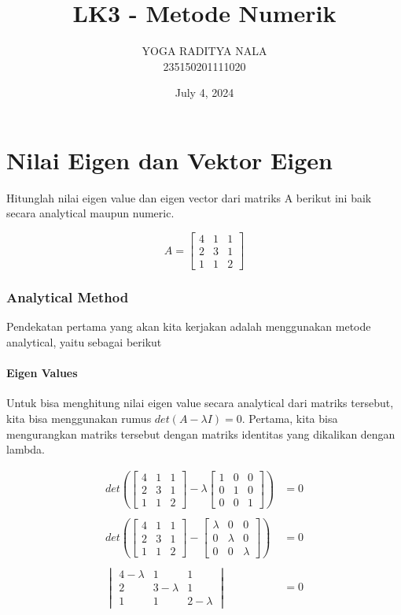 \documentclass{article}
\title{LK3 - Metode Numerik}
\author{YOGA RADITYA NALA\\
235150201111020}
\date{July 4, 2024}
\begin{document}
\maketitle

\part{Nilai Eigen dan Vektor Eigen}
Hitunglah nilai eigen value dan eigen vector dari matriks A berikut ini baik secara analytical maupun numeric.

$$
A=
\begin{bmatrix}
4 & 1 & 1\\
2 & 3 & 1\\
1 & 1 & 2
\end{bmatrix}
$$

\section{Analytical Method}
Pendekatan pertama yang akan kita kerjakan adalah menggunakan metode analytical, yaitu sebagai berikut\\

\subsection{Eigen Values}
Untuk bisa menghitung nilai eigen value secara analytical dari matriks tersebut, kita bisa menggunakan rumus $det(A - \lambda I) = 0$. Pertama, kita bisa mengurangkan matriks tersebut dengan matriks identitas yang dikalikan dengan lambda.

\begin{align*}
det \left(
\begin{bmatrix}
4 & 1 & 1\\
2 & 3 & 1\\
1 & 1 & 2
\end{bmatrix}
- \lambda
\begin{bmatrix}
1 & 0 & 0\\
0 & 1 & 0\\
0 & 0 & 1
\end{bmatrix}
\right)
&= 0
\\\\
det \left(
\begin{bmatrix}
4 & 1 & 1\\
2 & 3 & 1\\
1 & 1 & 2
\end{bmatrix}
-
\begin{bmatrix}
\lambda & 0 & 0\\
0 & \lambda & 0\\
0 & 0 & \lambda
\end{bmatrix}
\right)
&= 0
\\\\
\begin{vmatrix}
4 - \lambda & 1 & 1\\
2 & 3 - \lambda & 1\\
1 & 1 & 2 - \lambda
\end{vmatrix}
&= 0
\end{align*}
\end{document}
